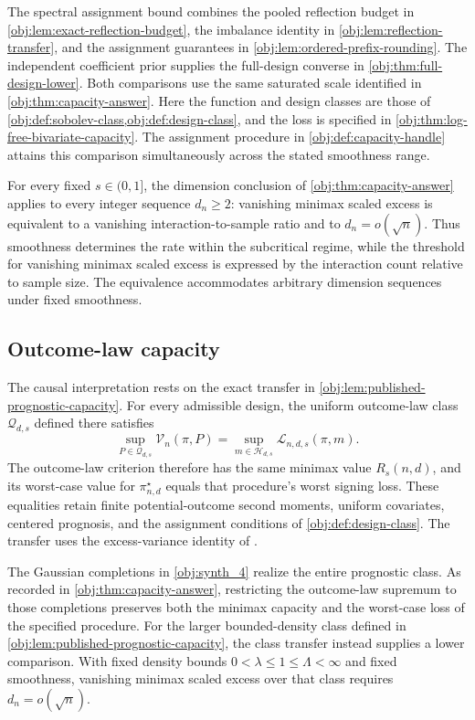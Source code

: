 \documentclass[11pt]{article}
\begin{document}
The spectral assignment bound combines the pooled reflection budget in \cref{obj:lem:exact-reflection-budget}, the imbalance identity in \cref{obj:lem:reflection-transfer}, and the assignment guarantees in \cref{obj:lem:ordered-prefix-rounding}. The independent coefficient prior supplies the full-design converse in \cref{obj:thm:full-design-lower}. Both comparisons use the same saturated scale identified in \cref{obj:thm:capacity-answer}. Here the function and design classes are those of \cref{obj:def:sobolev-class,obj:def:design-class}, and the loss is specified in \cref{obj:thm:log-free-bivariate-capacity}. The assignment procedure in \cref{obj:def:capacity-handle} attains this comparison simultaneously across the stated smoothness range.

For every fixed \(s\in(0,1]\), the dimension conclusion of \cref{obj:thm:capacity-answer} applies to every integer sequence \(d_n\geq2\): vanishing minimax scaled excess is equivalent to a vanishing interaction-to-sample ratio and to \(d_n=o(\sqrt n)\). Thus smoothness determines the rate within the subcritical regime, while the threshold for vanishing minimax scaled excess is expressed by the interaction count relative to sample size. The equivalence accommodates arbitrary dimension sequences under fixed smoothness.

\subsection{Outcome-law capacity}

The causal interpretation rests on the exact transfer in \cref{obj:lem:published-prognostic-capacity}. For every admissible design, the uniform outcome-law class \(\mathcal Q_{d,s}\) defined there satisfies
\[
\sup_{P\in\mathcal Q_{d,s}}\mathcal V_n(\pi,P)
=
\sup_{m\in\mathcal H_{d,s}}\mathcal L_{n,d,s}(\pi,m).
\]
The outcome-law criterion therefore has the same minimax value \(R_s(n,d)\), and its worst-case value for \(\pi^\star_{n,d}\) equals that procedure's worst signing loss. These equalities retain finite potential-outcome second moments, uniform covariates, centered prognosis, and the assignment conditions of \cref{obj:def:design-class}. The transfer uses the excess-variance identity of \citet[Proposition 2.3, equation (2.4), under Assumption 2.1 and Definition 2.2]{Cytrynbaum2026Limits}.

The Gaussian completions in \cref{obj:synth_4} realize the entire prognostic class. As recorded in \cref{obj:thm:capacity-answer}, restricting the outcome-law supremum to those completions preserves both the minimax capacity and the worst-case loss of the specified procedure. For the larger bounded-density class defined in \cref{obj:lem:published-prognostic-capacity}, the class transfer instead supplies a lower comparison. With fixed density bounds \(0<\lambda\leq1\leq\Lambda<\infty\) and fixed smoothness, vanishing minimax scaled excess over that class requires \(d_n=o(\sqrt n)\).
\end{document}
